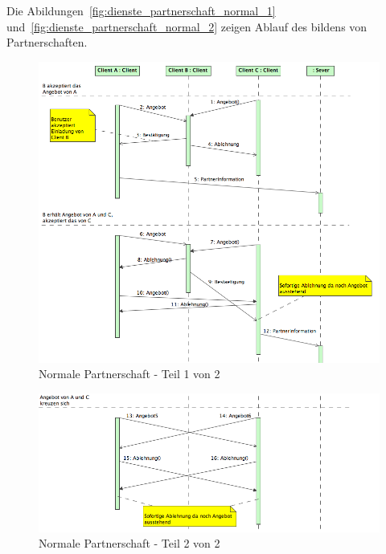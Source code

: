 \documentclass[12pt,halfparskip]{scrartcl}
\begin{document}
Die Abildungen~\vref{fig:dienste_partnerschaft_normal_1} und~\vref{fig:dienste_partnerschaft_normal_2} zeigen Ablauf des bildens von Partnerschaften.
\begin{figure}[h]
	\centering
	\includegraphics[width=\textwidth]{dienste_partnerschaft_normal_1}
	\caption{Normale Partnerschaft - Teil 1 von 2}
	\label{fig:dienste_partnerschaft_normal_1}
\end{figure}
\begin{figure}[h]
	\centering
	\includegraphics[width=\textwidth]{dienste_partnerschaft_normal_2}
	\caption{Normale Partnerschaft - Teil 2 von 2}
	\label{fig:dienste_partnerschaft_normal_2}
\end{figure}
\end{document}
